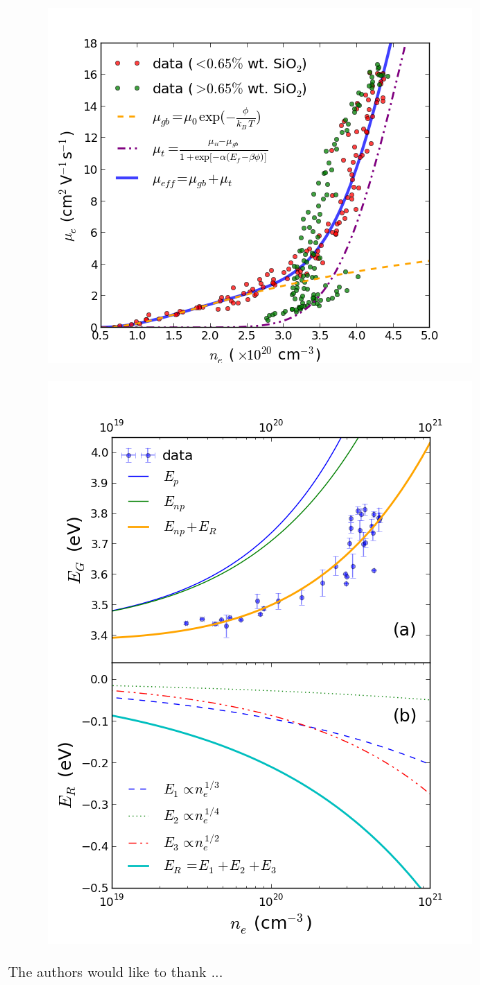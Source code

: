 \documentclass[aps,prl,5p,showpacs,showkeys,linenumbers, twocolumn]{revtex4-1}
\begin{document}
\begin{figure}[p]
\includegraphics[width=1\columnwidth]{figure4.png}
\caption{\label{fig:4} }
\end{figure}

\begin{figure}[p]
\includegraphics[width = 1\columnwidth]{figure5.png}
\end{figure}

\begin{acknowledgements}
The authors would like to thank ...
\end{acknowledgements}
\end{document}
